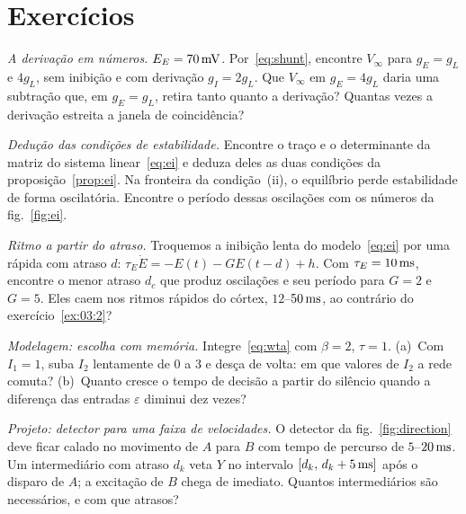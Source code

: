 \section{Exercícios}

\begin{exercise}[\lvlA]
\label{ex:03:1}
\emph{A derivação em números.} $E_E=70\,\text{mV}$. Por~\eqref{eq:shunt}, encontre $V_\infty$ para $g_E=g_L$ e $4g_L$, sem inibição e com derivação $g_I=2g_L$. Que $V_\infty$ em $g_E=4g_L$ daria uma subtração que, em $g_E=g_L$, retira tanto quanto a derivação? Quantas vezes a derivação estreita a janela de coincidência?
\end{exercise}

\begin{exercise}[\lvlB]
\label{ex:03:2}
\emph{Dedução das condições de estabilidade.} Encontre o traço e o determinante da matriz do sistema linear~\eqref{eq:ei} e deduza deles as duas condições da proposição~\ref{prop:ei}. Na fronteira da condição~(ii), o equilíbrio perde estabilidade de forma oscilatória. Encontre o período dessas oscilações com os números da fig.~\ref{fig:ei}.
\end{exercise}

\begin{exercise}[\lvlB]
\label{ex:03:3}
\emph{Ritmo a partir do atraso.} Troquemos a inibição lenta do modelo~\eqref{eq:ei} por uma rápida com atraso $d$: $\tau_E\dot E=-E(t)-GE(t-d)+h$. Com $\tau_E=10\,\text{ms}$, encontre o menor atraso $d_c$ que produz oscilações e seu período para $G=2$ e $G=5$. Eles caem nos ritmos rápidos do córtex, $12$--$50\,\text{ms}$, ao contrário do exercício~\ref{ex:03:2}?
\end{exercise}

\begin{exercise}[\lvlB]
\label{ex:03:4}
\emph{Modelagem: escolha com memória.} Integre~\eqref{eq:wta} com $\beta=2$, $\tau=1$. (a)~Com $I_1=1$, suba $I_2$ lentamente de $0$ a $3$ e desça de volta: em que valores de $I_2$ a rede comuta? (b)~Quanto cresce o tempo de decisão a partir do silêncio quando a diferença das entradas $\varepsilon$ diminui dez vezes?
\end{exercise}

\begin{exercise}[\lvlB]
\label{ex:03:5}
\emph{Projeto: detector para uma faixa de velocidades.} O detector da fig.~\ref{fig:direction} deve ficar calado no movimento de $A$ para $B$ com tempo de percurso de $5$--$20\,\text{ms}$. Um intermediário  com atraso $d_k$ veta $Y$ no intervalo $[d_k,\,d_k+5\,\text{ms}]$ após o disparo de $A$; a excitação de $B$ chega de imediato. Quantos intermediários são necessários, e com que atrasos?
\end{exercise}


